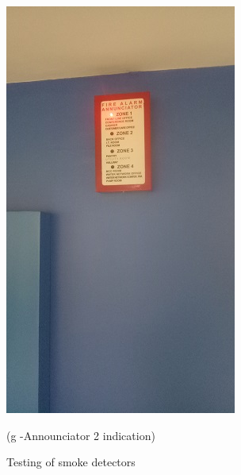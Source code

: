 \begin{figure}
\begin{minipage}[b]{0.25\linewidth}
	\includegraphics[width=\textwidth]{figures/R1P_fdas/annunciator2.jpg}
	\caption*{(g -Announciator 2 indication)}
\end{minipage}
	\caption{Testing of smoke detectors}
	\label{ch04_fig_fdas02}
\end{figure}